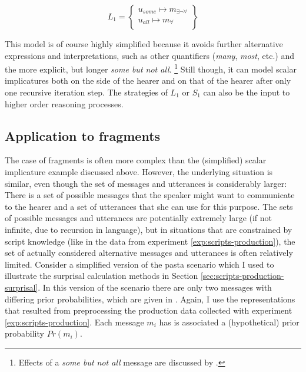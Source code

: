 \begin{equation}
L_1 = \begin{Bmatrix} u_{some} \mapsto m_{\exists\neg\forall} \\
        u_{all} \mapsto m_{\forall}\\
       \end{Bmatrix}\label{eq:gt_l1}
\end{equation}

This model is of course highly simplified because it avoids further alternative expressions and interpretations, such as other quantifiers (\textit{many}, \textit{most}, etc.) and the more explicit, but longer \textit{some but not all}.%
%
\footnote{Effects of a \textit{some but not all} message are discussed by \citet[77, 127]{franke2009}.}\afterfn%
%
Still though, it can model scalar implicatures both on the side of the hearer and on that of the hearer after only one recursive iteration step. The strategies of $L_1$ or $S_1$ can also be the input to higher order reasoning processes.

\subsection{Application to fragments}
The case of fragments is often more complex than the (simplified) scalar implicature example discussed above. However, the underlying situation is similar, even though the set of messages and utterances is considerably larger: There is a set of possible messages that the speaker might want to communicate to the hearer and a set of utterances that she can use for this purpose. The sets of possible messages and utterances are potentially extremely large (if not infinite, due to recursion in language), but in situations that are constrained by script knowledge (like in the data from experiment \ref{exp:scripts-production}), the set of actually considered alternative messages and utterances is often relatively limited.  Consider a simplified version of the pasta scenario which I used to illustrate the surprisal calculation methods in Section \ref{sec:scripts-production-surprisal}. In this version of the scenario there are only two messages with differing prior probabilities, which are given in \Next. Again, I use the representations that resulted from preprocessing the production data collected with experiment \ref{exp:scripts-production}. Each message $m_i$ has is associated a (hypothetical) prior probability $Pr(m_i)$.

